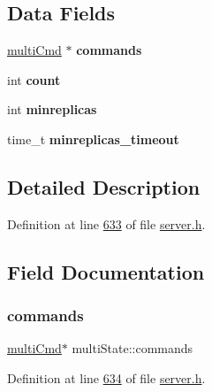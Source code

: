 \subsection*{Data Fields}
\begin{DoxyCompactItemize}
\item 
\mbox{\label{structmultiState_aa71ade48c7c23c0e2dc7b0b67ac02d2e}} 
\hyperlink{structmultiCmd}{multi\+Cmd} $\ast$ {\bfseries commands}
\item 
\mbox{\label{structmultiState_a6e7a211ef8a0afacb59f351c00148f00}} 
int {\bfseries count}
\item 
\mbox{\label{structmultiState_a57f8daa6e7c41c6070c218796218c9e5}} 
int {\bfseries minreplicas}
\item 
\mbox{\label{structmultiState_a61df4a277eaa32bcf146055cd635e750}} 
time\+\_\+t {\bfseries minreplicas\+\_\+timeout}
\end{DoxyCompactItemize}


\subsection{Detailed Description}


Definition at line \hyperlink{server_8h_source_l00633}{633} of file \hyperlink{server_8h_source}{server.\+h}.



\subsection{Field Documentation}
\mbox{\label{structmultiState_aa71ade48c7c23c0e2dc7b0b67ac02d2e}} 
\subsubsection{\texorpdfstring{commands}{commands}}
{\footnotesize\ttfamily \hyperlink{structmultiCmd}{multi\+Cmd}$\ast$ multi\+State\+::commands}



Definition at line \hyperlink{server_8h_source_l00634}{634} of file \hyperlink{server_8h_source}{server.\+h}.

